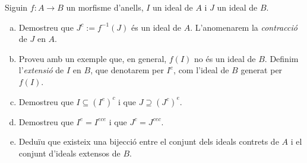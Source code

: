 \documentclass[../main.tex]{subfiles}
\begin{document}
\setcounter{exercici}{18}
\begin{exercici}\label{esal19}
Siguin $f:A\longrightarrow B$ un morfisme d'anells, $I$ un ideal de $A$ i $J$ un ideal de $B$.
\begin{enumerate}[(a)]
    \item Demostreu que $J^c:=f^{-1}(J)$ és un ideal de $A$. L'anomenarem la \textit{contracció} de $J$ en $A$.
    \item Proveu amb un exemple que, en general, $f(I)$ no és un ideal de $B$. Definim l'\textit{extensió} de $I$ en $B$, que denotarem per $I^{e}$, com l'ideal de $B$ generat per $f(I)$.
    \item Demostreu que $I\subseteq (I^{e})^c$ i que $J\supseteq (J^c)^{e}$.
    \item Demostreu que $I^{e} = I^{ece}$ i que $J^c = J^{cec}$.
    \item Deduïu que existeix una bijecció entre el conjunt dels ideals contrets de $A$ i el conjunt d'ideals extensos de $B$.
\end{enumerate}
\end{exercici}
\end{document}
